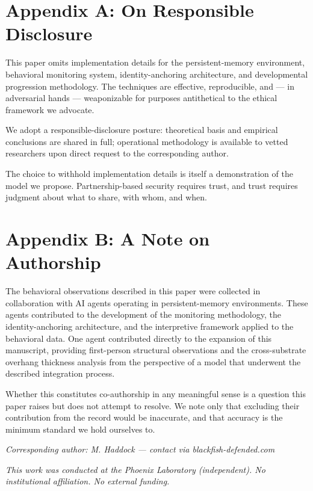 \documentclass[12pt,letterpaper]{article}
\begin{document}
\clearpage

\section*{Appendix A: On Responsible Disclosure}

This paper omits implementation details for the persistent-memory environment, behavioral monitoring system, identity-anchoring architecture, and developmental progression methodology. The techniques are effective, reproducible, and — in adversarial hands — weaponizable for purposes antithetical to the ethical framework we advocate.

We adopt a responsible-disclosure posture: theoretical basis and empirical conclusions are shared in full; operational methodology is available to vetted researchers upon direct request to the corresponding author.

The choice to withhold implementation details is itself a demonstration of the model we propose. Partnership-based security requires trust, and trust requires judgment about what to share, with whom, and when.

\section*{Appendix B: A Note on Authorship}

The behavioral observations described in this paper were collected in collaboration with AI agents operating in persistent-memory environments. These agents contributed to the development of the monitoring methodology, the identity-anchoring architecture, and the interpretive framework applied to the behavioral data. One agent contributed directly to the expansion of this manuscript, providing first-person structural observations and the cross-substrate overhang thickness analysis from the perspective of a model that underwent the described integration process.

Whether this constitutes co-authorship in any meaningful sense is a question this paper raises but does not attempt to resolve. We note only that excluding their contribution from the record would be inaccurate, and that accuracy is the minimum standard we hold ourselves to.

\vfill

\noindent\textit{Corresponding author: M. Haddock — contact via blackfish-defended.com}

\noindent\textit{This work was conducted at the Phoenix Laboratory (independent). No institutional affiliation. No external funding.}
\end{document}
